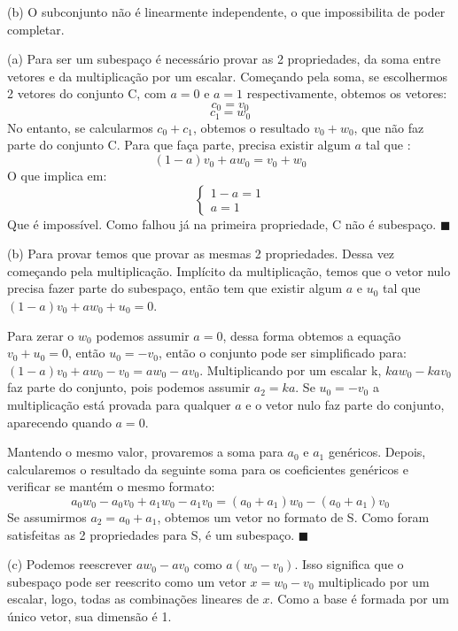 \documentclass{homework}
\begin{document}
(b) O subconjunto não é linearmente independente, o que impossibilita de poder completar. 

\exercise*
(a) Para ser um subespaço é necessário provar as 2 propriedades, da soma entre vetores e da multiplicação por um escalar. Começando pela soma, se escolhermos 2 vetores do conjunto C, com $a=0$ e $a=1$ respectivamente, obtemos os vetores:
\[c_0 = v_0\]
\[c_1 = w_0\]
No entanto, se calcularmos $c_0 + c_1$, obtemos o resultado $v_0 + w_0$, que não faz parte do conjunto C. Para que faça parte, precisa existir algum $a$ tal que :
\[(1-a)v_0 + aw_0 = v_0 + w_0\]
O que implica em:
\[\begin{cases}
1-a = 1\\
a = 1
\end{cases}\]
Que é impossível. Como falhou já na primeira propriedade, C não é subespaço. $\blacksquare$

(b) Para provar temos que provar as mesmas 2 propriedades. Dessa vez começando pela multiplicação. Implícito da multiplicação, temos que o vetor nulo precisa fazer parte do subespaço, então tem que existir algum $a$ e $u_0$ tal que $(1-a)v_0 + aw_0 + u_0 = 0$.

Para zerar o $w_0$ podemos assumir $a=0$, dessa forma obtemos a equação $v_0 + u_0 = 0$, então $u_0 = -v_0$, então o conjunto pode ser simplificado para: $(1-a)v_0 + aw_0 - v_0 = aw_0 - av_0$. Multiplicando por um escalar k, $kaw_0 - kav_0$ faz parte do conjunto, pois podemos assumir $a_2 = ka$. Se $u_0 = -v_0$ a multiplicação está provada para qualquer $a$ e o vetor nulo faz parte do conjunto, aparecendo quando $a=0$.

Mantendo o mesmo valor, provaremos a soma para $a_0$ e $a_1$ genéricos. Depois, calcularemos o resultado da seguinte soma para os coeficientes genéricos e verificar se mantém o mesmo formato:
\[a_0w_0 - a_0v_0 + a_1w_0 - a_1v_0 = (a_0+a_1)w_0 - (a_0+a_1)v_0\]
Se assumirmos $a_2 = a_0+a_1$, obtemos um vetor no formato de S. Como foram satisfeitas as 2 propriedades para S, é um subespaço. $\blacksquare$

(c) Podemos reescrever $aw_0 - av_0$ como $a(w_0-v_0)$. Isso significa que o subespaço pode ser reescrito como um vetor $x = w_0-v_0$ multiplicado por um escalar, logo, todas as combinações lineares de $x$. Como a base é formada por um único vetor, sua dimensão é 1.
\end{document}
